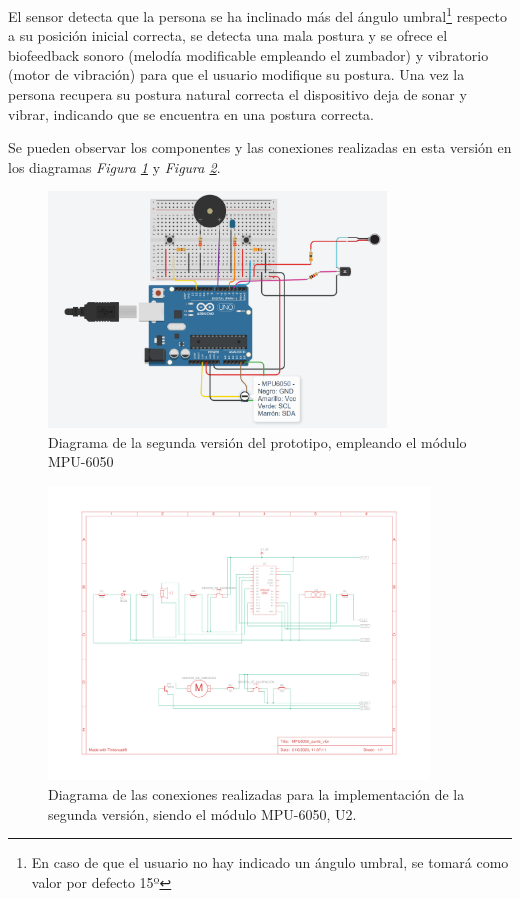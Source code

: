 El sensor detecta que la persona se ha inclinado más del ángulo umbral\footnote{En caso de que el usuario no hay indicado un ángulo umbral, se tomará como valor por defecto 15º} respecto a su posición inicial correcta, se detecta una mala postura y se ofrece el biofeedback sonoro (melodía modificable empleando el zumbador) y vibratorio (motor de vibración) para que el usuario modifique su postura. Una vez la persona recupera su postura natural correcta el dispositivo deja de sonar y vibrar, indicando que se encuentra en una postura correcta. 

Se pueden observar los componentes y las conexiones realizadas en esta versión en los diagramas \textit{Figura \ref{fig:ProtV2}} y \textit{Figura \ref{fig:ProtV2_esquema}}.

\begin{figure}[h!]
    \centering
    \includegraphics[width=0.8\textwidth]{img/PrototipoV2_MPU6050.png}
    \caption{Diagrama de la segunda versión del prototipo, empleando el módulo MPU-6050}
    \label{fig:ProtV2} 
\end{figure}

\begin{figure}[h]
    \centering
    \includegraphics[width=0.9\textwidth]{img/Prot_V2_Esquema.pdf}
    \caption{Diagrama de las conexiones realizadas para la implementación de la segunda versión, siendo el módulo MPU-6050, U2.}
    \label{fig:ProtV2_esquema} 
\end{figure}


